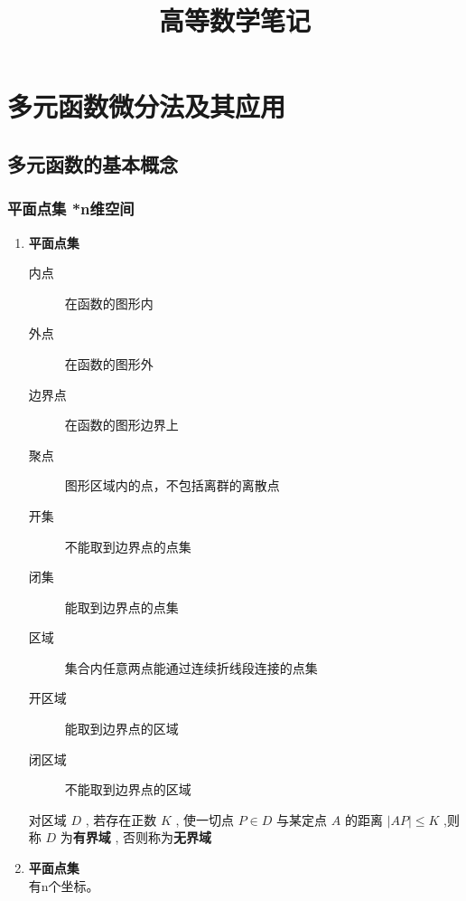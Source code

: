 \documentclass{article} %
\title{高等数学笔记}  %
\author{}   %
\date{}       %
\begin{document}
\maketitle          %

\tableofcontents
\thispagestyle{empty}
\clearpage
\setcounter{page}{1}





\section{多元函数微分法及其应用}
\subsection{多元函数的基本概念}
\subsubsection{平面点集 *n维空间}
\begin{enumerate}
    \item {
        \textbf{平面点集}
        \begin{description}
            \item[内点] {在函数的图形内}
            \item[外点] {在函数的图形外}
            \item[边界点] {在函数的图形边界上}
            \item[聚点] {图形区域内的点，不包括离群的离散点}
            \item[开集] {不能取到边界点的点集}
            \item[闭集] {能取到边界点的点集}
            \item[区域] {集合内任意两点能通过连续折线段连接的点集}
            \item[开区域]{能取到边界点的区域}
            \item[闭区域]{不能取到边界点的区域} 
        \end{description}

        对区域 $D$ , 若存在正数 $K$ , 使一切点 $P\in D$ 与某定点 $A$ 的距离 $|AP|\leq K$ ,则称 $D$ 为\textbf{有界域} , 否则称为\textbf{无界域}
    }
    
    \item {
        \textbf{平面点集}\\
        有n个坐标。
    }
\end{enumerate}
\end{document}
